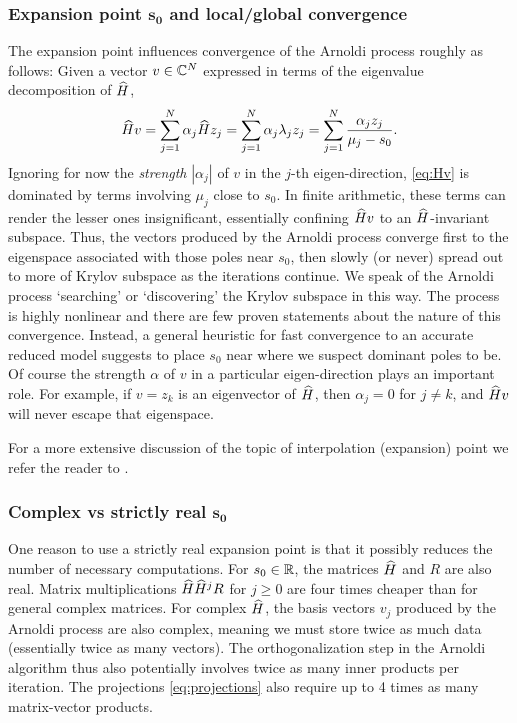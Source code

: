 \documentclass[letterpaper]{article}
\theoremstyle{remark}
\begin{document}
\begin{description}
   \subsubsection{Expansion point $\bm{s_0}$ and local/global convergence}
   The expansion point influences convergence of the Arnoldi process 
   roughly as follows: Given a vector $v\in\mathbb{C}^N$ expressed in terms 
   of the eigenvalue decomposition of $\widehat{H}$,
   \begin{equation}
   \widehat{H} v = \sum_{j=1}^N \alpha_j \widehat{H} z_j = \sum_{j=1}^N \alpha_j \lambda_j z_j
    = \sum_{j=1}^N \frac{\alpha_j z_j}{\mu_j - s_0}.
   \label{eq:Hv}
   \end{equation}
   Ignoring for now the \emph{strength} $|\alpha_j|$ of $v$ in the $j$-th 
   eigen-direction, \eqref{eq:Hv} is dominated by terms involving 
   $\mu_j$ close to $s_0$.  In finite arithmetic, these terms can render the 
   lesser ones insignificant, essentially confining $\widehat{H} v$ to 
   an $\widehat{H}$-invariant subspace.  Thus, the vectors produced by the Arnoldi 
   process converge first to 
   the eigenspace 
   associated with those poles near $s_0$, then 
   slowly (or never) spread out to more of Krylov subspace as the 
   iterations
   continue.  We speak of the Arnoldi process `searching' or `discovering'
   the Krylov subspace in this way.
   The process is highly nonlinear and there are few proven
   statements
   about the nature of this convergence.  Instead, a general 
   heuristic for fast convergence to an accurate reduced model 
   suggests to place $s_0$ near where we suspect dominant poles to be.
   Of course the strength $\alpha$ of $v$ in a particular eigen-direction
   plays an important role.  For example, if $v=z_k$ is an eigenvector of $\widehat{H}$,
   then $\alpha_j=0$ for $j\neq k$, and $\widehat{H} v$
   will never escape that eigenspace.
   
   For a more extensive discussion of the topic of interpolation (expansion)
    point we refer the reader to \cite[chapter 6]{grimme97}. 
   
   
   \subsubsection{Complex vs strictly real $\bm{s_0}$}
   One reason to use a strictly real expansion point is that it 
   possibly reduces the number of necessary computations.  For $s_0\in\mathbb{R}$,
   the matrices $\widehat{H}$ and $R$ are also real.  Matrix multiplications 
   $\widehat{H}\widehat{H}^jR$ for $j\geq0$ are four times cheaper than for general 
   complex matrices.  For complex $\widehat{H}$, the basis vectors $v_j$ produced 
   by the Arnoldi process are also complex, meaning we must store twice
   as much data (essentially twice as many vectors).  The orthogonalization
   step in the Arnoldi algorithm thus also potentially involves twice as many inner
   products per iteration.  The projections \eqref{eq:projections} also require 
   up to 4 times as many matrix-vector products.  
   

\end{description}
\end{document}
